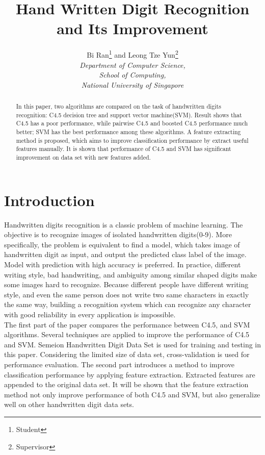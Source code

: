 \documentclass[a4paper,11pt]{nurop}
\begin{document}
\author{\large{Bi Ran}\footnote{Student} and \large{Leong Tze Yun}\footnote{Supervisor}\\
	\normalsize\textit{Department of Computer Science,\\
	School of Computing,\\
	National University of Singapore}
}
\title{Hand Written Digit Recognition and Its Improvement}

\maketitle
\begin{abstract}
In this paper, two algorithms are compared on the task of handwritten digits recognition: C4.5 decision tree and support vector machine(SVM). Result shows that C4.5 has a poor performance, while pairwise C4.5 and boosted C4.5 performance much better; SVM has the best performance among these algorithms. A feature extracting method is proposed, which aims to improve classification performance by extract useful features manually. It is shown that performance of C4.5 and SVM has significant improvement on data set with new features added.
\end{abstract}
\section{Introduction}
 Handwritten digits recognition is a classic problem of machine learning. The objective is to recognize images of isolated handwritten digits(0-9). More specifically, the problem is equivalent to find a model, which takes image of handwritten digit as input, and output the predicted class label of the image. Model with prediction with high accuracy is preferred. In practice, different writing style, bad handwriting, and ambiguity among similar shaped digits make some images hard to recognize. Because different people have different writing style, and even the same person does not write two same characters in exactly the same way, building a recognition system which can recognize any character with good reliability in every application is impossible\cite{fabien06}.\\
 The first part of the paper compares the performance between C4.5, and SVM algorithms. Several techniques are applied to improve the performance of C4.5 and SVM. Semeion Handwritten Digit Data Set is used for training and testing in this paper. Considering the limited size of data set, cross-validation is used for performance evaluation. The second part introduces a method to improve classification performance by applying feature extraction. Extracted features are appended to the original data set. It will be shown that the feature extraction method not only improve performance of both C4.5 and SVM, but also generalize well on other handwritten digit data sets.
\end{document}
